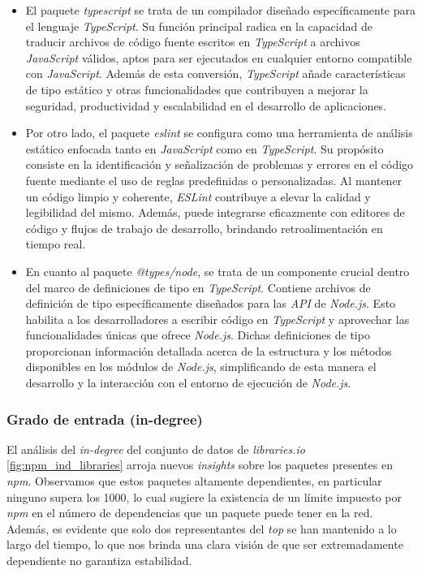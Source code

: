\begin{itemize}
    \item El paquete \textit{typescript} se trata de un compilador diseñado específicamente para el
          lenguaje \textit{TypeScript}. Su función principal radica en la capacidad de traducir archivos de código fuente
          escritos en \textit{TypeScript} a archivos \textit{JavaScript} válidos, aptos para ser ejecutados en cualquier
          entorno compatible con \textit{JavaScript}. Además de esta conversión, \textit{TypeScript} añade características
          de tipo estático y otras funcionalidades que contribuyen a mejorar la seguridad, productividad y escalabilidad
          en el desarrollo de aplicaciones.

    \item Por otro lado, el paquete \textit{eslint} se configura como una herramienta de análisis estático
          enfocada tanto en \textit{JavaScript} como en \textit{TypeScript}. Su propósito consiste en la identificación y
          señalización de problemas y errores en el código fuente mediante el uso de reglas predefinidas o personalizadas.
          Al mantener un código limpio y coherente, \textit{ESLint} contribuye a elevar la calidad y legibilidad del mismo.
          Además, puede integrarse eficazmente con editores de código y flujos de trabajo de desarrollo, brindando retroalimentación
          en tiempo real.

    \item En cuanto al paquete \textit{@types/node}, se trata de un componente crucial dentro del marco de
          definiciones de tipo en \textit{TypeScript}. Contiene archivos de definición de tipo específicamente diseñados para
          las \textit{API} de \textit{Node.js}. Esto habilita a los desarrolladores a escribir código en \textit{TypeScript}
          y aprovechar las funcionalidades únicas que ofrece \textit{Node.js}. Dichas definiciones de tipo proporcionan
          información detallada acerca de la estructura y los métodos disponibles en los módulos de \textit{Node.js},
          simplificando de esta manera el desarrollo y la interacción con el entorno de ejecución de \textit{Node.js}.
\end{itemize}

\subsubsection{Grado de entrada (in-degree)}

El análisis del \emph{in-degree} del conjunto de datos de \emph{libraries.io} \ref{fig:npm_ind_libraries} arroja nuevos \emph{insights} sobre
los paquetes presentes en \emph{npm}. Observamos que estos paquetes altamente dependientes, en particular ninguno
supera los 1000, lo cual sugiere la existencia de un límite impuesto por \emph{npm} en el número de dependencias que un
paquete puede tener en la red. Además, es evidente que solo dos representantes del \emph{top} se han mantenido a lo largo
del tiempo, lo que nos brinda una clara visión de que ser extremadamente dependiente no garantiza estabilidad.

